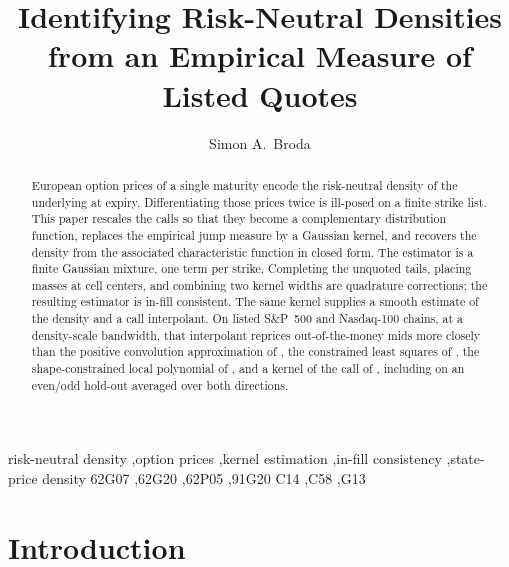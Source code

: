 \documentclass[preprint,12pt,authoryear,times]{elsarticle}
\begin{document}
\begin{frontmatter}

\title{Identifying Risk-Neutral Densities from an Empirical Measure of Listed Quotes}

\author[ifz]{Simon A.\ Broda}

\begin{abstract}
European option prices of a single maturity encode the risk-neutral density of the underlying at expiry. Differentiating those prices twice is ill-posed on a finite strike list. This paper rescales the calls so that they become a complementary distribution function, replaces the empirical jump measure by a Gaussian kernel, and recovers the density from the associated characteristic function in closed form. The estimator is a finite Gaussian mixture, one term per strike. Completing the unquoted tails, placing masses at cell centers, and combining two kernel widths are quadrature corrections; the resulting estimator is in-fill consistent. The same kernel supplies a smooth estimate of the density and a call interpolant. On listed S\&P~500 and Nasdaq-100 chains, at a density-scale bandwidth, that interpolant reprices out-of-the-money mids more closely than the positive convolution approximation of \citet{bondarenko2003}, the constrained least squares of \citet{yatchew2006}, the shape-constrained local polynomial of \citet{aitsahalia2003}, and a kernel of the call of \citet{priestley1972}, including on an even/odd hold-out averaged over both directions. 
\end{abstract}

\begin{keyword}
risk-neutral density \sep option prices \sep kernel estimation \sep in-fill consistency \sep state-price density
\MSC[2010] 62G07 \sep 62G20 \sep 62P05 \sep 91G20
\JEL C14 \sep C58 \sep G13
\end{keyword}

\end{frontmatter}

\section{Introduction}
\label{sec:intro}
\end{document}
